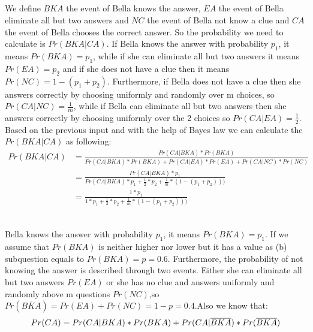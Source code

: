 \documentclass[11pt]{537homework}
\begin{document}
\subsection{}
We define $BKA$ the event of Bella knows the answer, $EA$ the event of Bella eliminate all but two answers and $NC$ the event of Bella not know a clue and $CA$ the event of Bella chooses the correct answer. So the probability we need to calculate is $Pr(BKA|CA)$. If Bella knows the answer with probability $p_1$, it means $Pr(BKA) = p_1$, while if she can eliminate all but two answers it means  $Pr(EA) = p_2$ and if she does not have a clue then it means $Pr(NC) = 1 - (p_1+p_2)$. Furthermore, if Bella does not have a clue then she answers correctly by choosing uniformly and randomly over m choices, so $Pr(CA|NC)= \frac{1}{m}$, while if Bella can eliminate all but two answers then she answers correctly by choosing uniformly over the 2 choices so $Pr(CA|EA) = \frac{1}{2}$. Based on the previous input and with the help of Bayes law we can calculate the $Pr(BKA|CA)$ as following:
   \begin{align*}
        Pr(BKA|CA) &= \frac{Pr(CA|BKA)*Pr(BKA)}{Pr(CA|BKA)*Pr(BKA)+Pr(CA|EA)*Pr(EA)+Pr(CA|NC)*Pr(NC)} \\[0.25cm]
                &= \displaystyle{\frac{Pr(CA|BKA)* p_1 }{Pr(CA|BKA)*p_1+\frac{1}{2}*p_2+\frac{1}{m}*(1-(p_1+p_2)))}} \\[0.25cm]
                &= \displaystyle{\frac{1* p_1 }{1*p_1+\frac{1}{2}*p_2+\frac{1}{m}*(1-(p_1+p_2)))}} \\[0.25cm]
   \end{align*}

\subsection{}
Bella knows the answer with probability $p_1$, it means $Pr(BKA) = p_1$. If we assume that $Pr(BKA)$ is neither higher nor lower but it has a value as (b) subquestion equals to $Pr(BKA)=p=0.6$. Furthermore, the probability of not knowing the answer is described through two events. Either she can eliminate all but two answers $Pr(EA)$ or she has no clue and answers uniformly and randomly above m questions $Pr(NC)$,so $Pr(\overline{BKA})=Pr(EA)+Pr(NC)=1-p=0.4$.Also we know that:
\begin{equation*}
          Pr(CA) = Pr(CA|BKA)*Pr(BKA)+Pr(CA|\overline{BKA})*Pr(\overline{BKA}) \\
\end{equation*}
\end{document}

